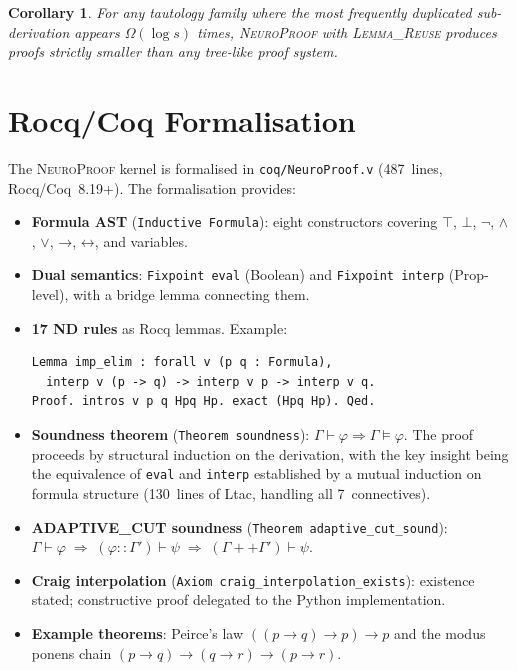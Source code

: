 \documentclass[conference]{IEEEtran}
\newtheorem{corollary}[theorem]{Corollary}
\newcommand{\entails}{\vDash}
\newcommand{\proves}{\vdash}
\newcommand{\dland}{\mathbin{\wedge}}
\newcommand{\dlor}{\mathbin{\vee}}
\newcommand{\dlnot}{\neg}
\newcommand{\dlimp}{\mathbin{\to}}
\newcommand{\dliff}{\mathbin{\leftrightarrow}}
\newcommand{\dlbot}{\bot}
\newcommand{\dltop}{\top}
\newcommand{\NP}{\textsc{NeuroProof}}
\begin{document}
\begin{corollary}
  For any tautology family where the most frequently duplicated
  sub-derivation appears $\Omega(\log s)$ times, \NP{} with
  \textsc{Lemma\_Reuse} produces proofs \emph{strictly smaller} than
  any tree-like proof system.
\end{corollary}

\section{Rocq/Coq Formalisation}
\label{sec:rocq}

The \NP{} kernel is formalised in \texttt{coq/NeuroProof.v}
(487~lines, Rocq/Coq~8.19+).  The formalisation provides:

\begin{itemize}
  \item \textbf{Formula AST} (\texttt{Inductive Formula}): eight
    constructors covering $\dltop$, $\dlbot$, $\dlnot$, $\dland$,
    $\dlor$, $\dlimp$, $\dliff$, and variables.
  \item \textbf{Dual semantics}:
    \texttt{Fixpoint eval} (Boolean) and \texttt{Fixpoint interp}
    (Prop-level), with a bridge lemma connecting them.
  \item \textbf{17 ND rules} as Rocq lemmas.  Example:
    \begin{lstlisting}[gobble=4]
Lemma imp_elim : forall v (p q : Formula),
  interp v (p -> q) -> interp v p -> interp v q.
Proof. intros v p q Hpq Hp. exact (Hpq Hp). Qed.
    \end{lstlisting}
  \item \textbf{Soundness theorem}
    (\texttt{Theorem soundness}):
    $\Gamma \proves \varphi \Rightarrow \Gamma \entails \varphi$.
    The proof proceeds by structural induction on the derivation,
    with the key insight being the equivalence of \texttt{eval} and
    \texttt{interp} established by a mutual induction on formula
    structure (130~lines of Ltac, handling all 7~connectives).
  \item \textbf{ADAPTIVE\_CUT soundness}
    (\texttt{Theorem adaptive\_cut\_sound}):
    $\Gamma \proves \varphi \;\Rightarrow\;
    (\varphi :: \Gamma') \proves \psi
    \;\Rightarrow\;
    (\Gamma ++ \Gamma') \proves \psi$.
  \item \textbf{Craig interpolation}
    (\texttt{Axiom craig\_interpolation\_exists}):
    existence stated; constructive proof delegated to the Python
    implementation.
  \item \textbf{Example theorems}: Peirce's law
    $((p \to q) \to p) \to p$ and the modus ponens chain
    $(p \to q) \to (q \to r) \to (p \to r)$.
\end{itemize}
\end{document}
